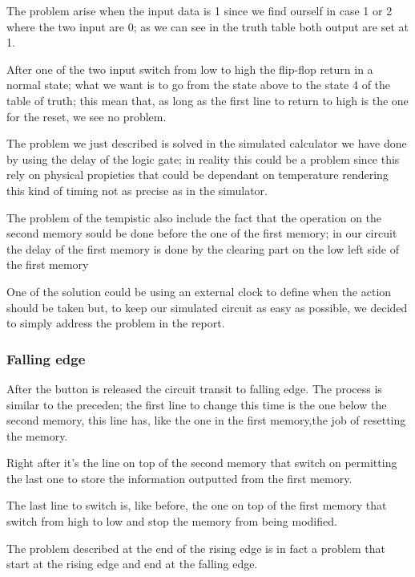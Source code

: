 \documentclass{article}
\begin{document}
The problem arise when the input data is 1 since we find ourself in case 1 or 2 where the two input are 0; as we can see in the truth table both output are set at 1.

After one of the two input switch from low to high the flip-flop return in a normal state; what we want is to go from the state above to the state 4 of the table of truth; this mean that, as long as the first line to return to high is the one for the reset, we see no problem.

\vspace{3mm}

The problem we just described is solved in the simulated calculator we have done by using the delay of the logic gate; in reality this could be a problem since this rely on physical propieties that could be dependant on temperature rendering this kind of timing not as precise as in the simulator.

The problem of the tempistic also include the fact that the operation on the second memory sould be done before the one of the first memory; in our circuit the delay of the first memory is done by the clearing part on the low left side of the first memory

One of the solution could be using an external clock to define when the action should be taken but, to keep our simulated circuit as easy as possible, we decided to simply address the problem in the report.


\subsubsection{Falling edge}

After the button is released the circuit transit to falling edge.
The process is similar to the preceden; the first line to change this time is the one below the second memory, this line has, like the one in the first memory,the job of resetting the memory.

Right after it's the line on top of the second memory that switch on permitting the last one to store the information outputted from the first memory.

The last line to switch is, like before, the one on top of the first memory that switch from high to low and stop the memory from being modified.

\vspace{3mm}

The problem described at the end of the rising edge is in fact a problem that start at the rising edge and end at the falling edge. 
\end{document}
